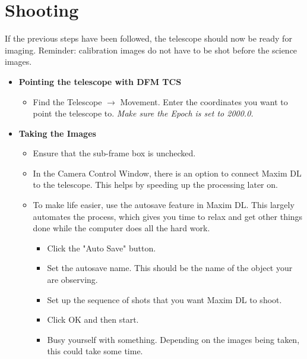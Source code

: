 \documentclass[letterpaper, 12pt]{report}
\begin{document}
\newpage



\chapter{Shooting}\label{ch:5}

If the previous steps have been followed, the telescope should now be ready for imaging. Reminder: calibration images do not have to be shot before the science images. 

\begin{itemize}
	\item \large \textbf{Pointing the telescope with DFM TCS}
	\begin{itemize}
		\item Find the Telescope $\rightarrow$ Movement. Enter the coordinates you want to point the telescope to. {\large \emph{Make sure the Epoch is set to 2000.0.}}
	\end{itemize}
	\item \large \textbf{Taking the Images}
	\begin{itemize}
		\item Ensure that the sub-frame box is unchecked.
		\item In the Camera Control Window, there is an option to connect Maxim DL to the telescope. This helps by speeding up the processing later on.
		\item To make life easier, use the autosave feature in Maxim DL. This largely automates the process, which gives you time to relax and get other things done while the computer does all the hard work.
		\begin{itemize}
			\item Click the "Auto Save" button.
			\item Set the autosave name. This should be the name of the object your are observing.
			\item Set up the sequence of shots that you want Maxim DL to shoot.
			\item Click OK and then start.
			\item Busy yourself with something. Depending on the images being taken, this could take some time.
		\end{itemize}
	\end{itemize}
\end{itemize}

\newpage
\end{document}
